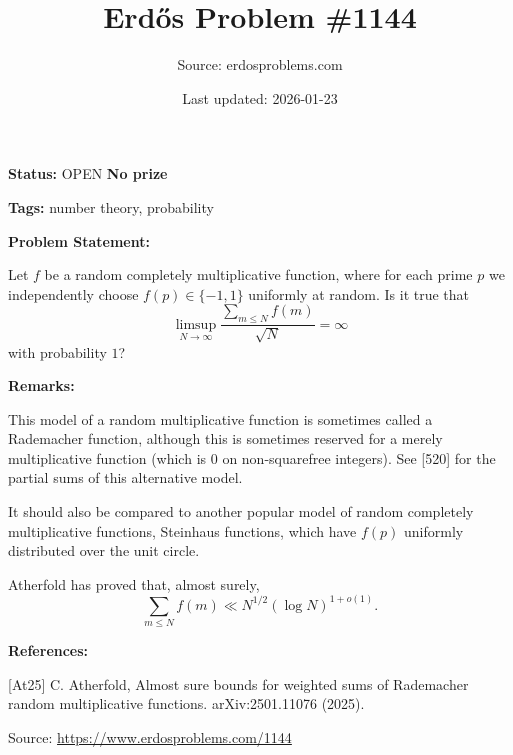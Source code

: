 \documentclass{article}
\title{Erd\H{o}s Problem \#1144}
\date{Last updated: 2026-01-23}
\author{Source: erdosproblems.com}
\begin{document}
\maketitle

\noindent\textbf{Status:} OPEN \quad \textbf{No prize}

\noindent\textbf{Tags:} number theory, probability

\medskip
\noindent\textbf{Problem Statement:}

Let $f$ be a random completely multiplicative function, where for each prime $p$ we independently choose $f(p)\in \{-1,1\}$ uniformly at random. Is it true that\[\limsup_{N\to \infty}\frac{\sum_{m\leq N}f(m)}{\sqrt{N}}=\infty\]with probability $1$?

\bigskip
\noindent\textbf{Remarks:}

This model of a random multiplicative function is sometimes called a Rademacher function, although this is sometimes reserved for a merely multiplicative function (which is $0$ on non-squarefree integers). See [520] for the partial sums of this alternative model.

It should also be compared to another popular model of random completely multiplicative functions, Steinhaus functions, which have $f(p)$ uniformly distributed over the unit circle.

Atherfold \cite{At25} has proved that, almost surely,\[\sum_{m\leq N}f(m)\ll N^{1/2}(\log N)^{1+o(1)}.\]

\bigskip
\noindent\textbf{References:}

[At25] C. Atherfold, Almost sure bounds for weighted sums of Rademacher random multiplicative functions. arXiv:2501.11076 (2025).

\bigskip
\noindent\small{Source: \url{https://www.erdosproblems.com/1144}}
\end{document}
